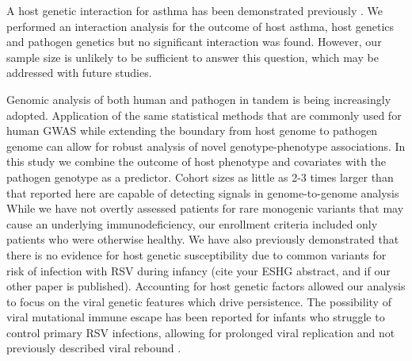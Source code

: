 \documentclass{article}
\begin{document}
A host genetic interaction for asthma has been demonstrated previously 
\cite{moffatt2010large}.
We performed an interaction analysis for the outcome of host asthma, 
host genetics and pathogen genetics 
but no significant interaction was found. 
However, our sample size is unlikely to be sufficient to answer this question, 
which may be addressed with future studies. 

Genomic analysis of both human and pathogen in tandem is being increasingly adopted. 
Application of the same statistical methods that are commonly used for human GWAS while extending the boundary from host genome to pathogen genome can allow for robust analysis of novel genotype-phenotype associations.
In this study we combine the outcome of host phenotype and covariates with the pathogen genotype as a predictor. 
Cohort sizes as little as 2-3 times larger than that reported here are capable of detecting signals in genome-to-genome analysis
\cite{fellay2020exploring}  %
While we have not overtly assessed patients for rare monogenic variants that may cause an underlying immunodeficiency, our enrollment criteria included only patients who were otherwise healthy.
We have also previously demonstrated that there is no evidence for host genetic susceptibility due to common variants for risk of infection with RSV during infancy 
(cite your ESHG abstract, and if our other paper is published).
Accounting for host genetic factors allowed our analysis to focus on the viral genetic features which drive 
persistence.
The possibility of viral mutational immune escape has been reported for 
infants who struggle to control primary RSV infections, allowing for prolonged viral replication and not previously described viral rebound
\cite{brint2017prolonged}.
\end{document}

